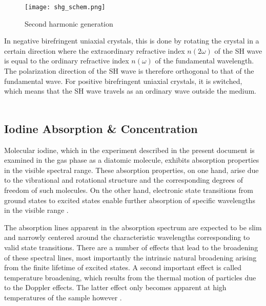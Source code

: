     \begin{figure}
        \centering
        \vspace{-\normalbaselineskip}
        \texttt{[image: shg\_schem.png]}
        \vspace{-10pt}
        \caption{Second harmonic generation \cite{shg}  }
        
        \label{fig:shg:basic}
    \end{figure}
    In negative birefringent uniaxial crystals, this is done by rotating the crystal in a certain direction where the extraordinary refractive index $n(2\omega)$ of the SH wave is equal to the ordinary refractive index $n(\omega)$ of the fundamental wavelength.
    The polarization direction of the SH wave is therefore orthogonal to that of the fundamental wave.
    For positive birefringent uniaxial crystals, it is switched, which means that the SH wave travels as an ordinary wave outside the medium.

\subsection{Iodine Absorption \& Concentration}

Molecular iodine, which in the experiment described in the present document is examined in the gas phase as a diatomic molecule, exhibits absorption properties in the visible spectral range. These absorption properties, on one hand, arise due to the vibrational and rotational structure and the corresponding degrees of freedom of such molecules. On the other hand, electronic state transitions from ground states to excited states enable further absorption of specific wavelengths in the visible range \cite{demtroder2014laser}.

The absorption lines apparent in the absorption spectrum are expected to be slim and narrowly centered around the characteristic wavelengths corresponding to valid state transitions. There are a number of effects that lead to the broadening of these spectral lines, most importantly the intrinsic natural broadening arising from the finite lifetime of excited states. A second important effect is called temperature broadening, which results from the thermal motion of particles due to the Doppler effects. The latter effect only becomes apparent at high temperatures of the sample however \cite{demtroder2014laser}.

